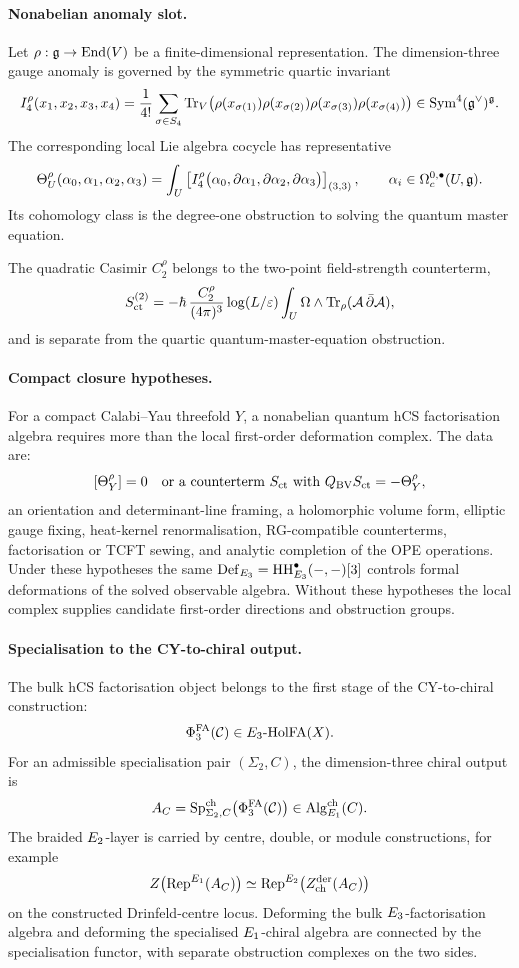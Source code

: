 \paragraph{Nonabelian anomaly slot.}
Let \(\rho:\mathfrak{g}\to\operatorname{End}(V)\) be a finite-dimensional representation. The
dimension-three gauge anomaly is governed by the symmetric quartic
invariant
\[
  I_4^\rho(x_1,x_2,x_3,x_4)
  =
  \frac1{4!}
  \sum_{\sigma\in S_4}
  \operatorname{Tr}_V\!\left(
  \rho(x_{\sigma(1)})\rho(x_{\sigma(2)})
  \rho(x_{\sigma(3)})\rho(x_{\sigma(4)})
  \right)
  \in\mathrm{Sym}^4(\mathfrak{g}^\vee)^{\mathfrak{g}} .
\]
The corresponding local Lie algebra cocycle has representative
\[
  \Theta^\rho_U(\alpha_0,\alpha_1,\alpha_2,\alpha_3)
  =
  \int_U
  \left[
  I_4^\rho\bigl(
  \alpha_0,\partial\alpha_1,\partial\alpha_2,\partial\alpha_3
  \bigr)
  \right]_{(3,3)},
  \qquad
  \alpha_i\in\Omega^{0,\bullet}_c(U,\mathfrak{g}).
\]
Its cohomology class is the degree-one obstruction to solving the
quantum master equation.

The quadratic Casimir \(C_2^\rho\) belongs to the two-point
field-strength counterterm,
\[
  S_{\mathrm{ct}}^{(2)}
  =
  -\hbar\,\frac{C_2^\rho}{(4\pi)^3}
  \log(L/\varepsilon)
  \int_U\Omega\wedge\operatorname{Tr}_\rho(\mathcal{A}\,\bar\partial\mathcal{A}),
\]
and is separate from the quartic quantum-master-equation obstruction.

\paragraph{Compact closure hypotheses.}
For a compact Calabi--Yau threefold \(Y\), a nonabelian quantum hCS
factorisation algebra requires more than the local first-order
deformation complex. The data are:
\[
  [\Theta^\rho_Y]=0
  \quad\hbox{or a counterterm }S_{\mathrm{ct}}\hbox{ with }
  Q_{\mathrm{BV}}S_{\mathrm{ct}}=-\Theta^\rho_Y,
\]
an orientation and determinant-line framing, a holomorphic volume form,
elliptic gauge fixing, heat-kernel renormalisation, RG-compatible
counterterms, factorisation or TCFT sewing, and analytic completion of
the OPE operations. Under these hypotheses the same
\(\mathrm{Def}_{E_3}=\mathrm{HH}^\bullet_{E_3}(-,-)[3]\) controls formal
deformations of the solved observable algebra. Without these
hypotheses the local complex supplies candidate first-order directions
and obstruction groups.

\paragraph{Specialisation to the CY-to-chiral output.}
The bulk hCS factorisation object belongs to the first stage of the
CY-to-chiral construction:
\[
  \Phi^{\mathrm{FA}}_3(\mathcal C)\in
  E_3\hbox{-}\mathrm{HolFA}(X).
\]
For an admissible specialisation pair \((\Sigma_2,C)\), the
dimension-three chiral output is
\[
  A_C
  =
  \mathrm{Sp}^{\mathrm{ch}}_{\Sigma_2,C}\bigl(\Phi^{\mathrm{FA}}_3(\mathcal C)\bigr)
  \in
  \mathrm{Alg}^{\mathrm{ch}}_{E_1}(C).
\]
The braided \(E_2\)-layer is carried by centre, double, or module
constructions, for example
\[
  Z\bigl(\mathrm{Rep}^{E_1}(A_C)\bigr)
  \simeq
  \mathrm{Rep}^{E_2}\bigl(
    Z^{\mathrm{der}}_{\mathrm{ch}}(A_C)
  \bigr)
\]
on the constructed Drinfeld-centre locus. Deforming the bulk
\(E_3\)-factorisation algebra and deforming the specialised
\(E_1\)-chiral algebra are connected by the specialisation functor,
with separate obstruction complexes on the two sides.

